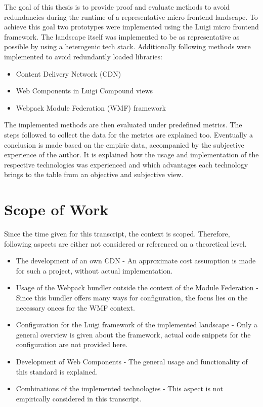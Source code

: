 The goal of this thesis is to provide proof and evaluate methods to avoid redundancies during the runtime of a representative micro frontend landscape. To achieve this goal two prototypes were implemented using the Luigi micro frontend framework. The landscape itself was implemented to be as representative as possible by using a heterogenic tech stack. Additionally following methods were implemented to avoid redundantly loaded libraries:

\begin{itemize}
	\item Content Delivery Network (CDN)
	\item Web Components in Luigi Compound views
	\item Webpack Module Federation (WMF) framework
\end{itemize}

The implemented methods are then evaluated under predefined metrics. The steps followed to collect the data for the metrics are explained too.
Eventually a conclusion is made based on the empiric data, accompanied by the subjective experience of the author. It is explained how the usage and implementation of the respective technologies was experienced and which advantages each technology brings to the table from an objective and subjective view.
  
\section{Scope of Work}

Since the time given for this transcript, the context is scoped. Therefore, following aspects are either not considered or referenced on a theoretical level.

\begin{itemize}
	\item The development of an own CDN - An approximate cost assumption is made for such a project, without actual implementation.
	\item Usage of the Webpack bundler outside the context of the Module Federation - Since this bundler offers many ways for configuration, the focus lies on the necessary onces for the WMF context.
	\item Configuration for the Luigi framework of the implemented landscape - Only a general overview is given about the framework, actual code snippets for the configuration are not provided here.
	\item Development of Web Components - The general usage and functionality of this standard is explained.
	\item Combinations of the implemented technologies - This aspect is not empirically considered in this transcript.
\end{itemize}

